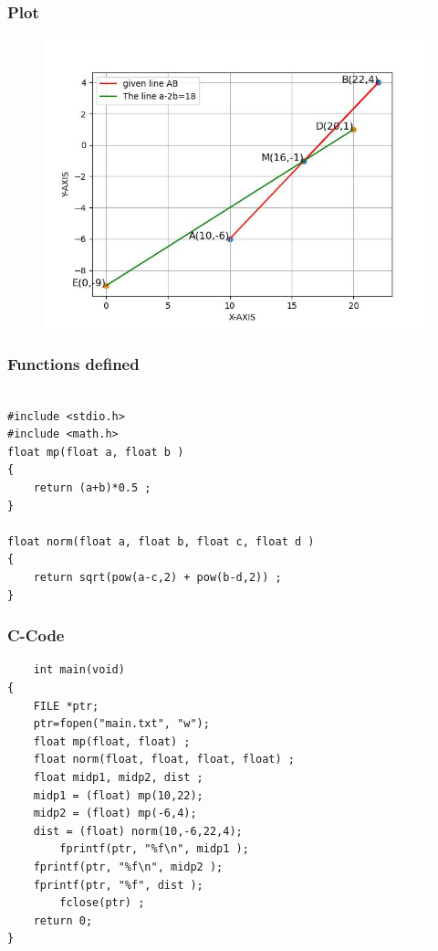\documentclass{beamer}
\begin{document}
\begin{frame}
\frametitle{Plot}
\begin{figure}
    \centering
    \includegraphics[width=0.7\linewidth]{figs/value.jpg}
    \caption{}
    \label{fig:enter-label}
\end{figure}
\end{frame}
\begin{frame}[fragile]
\frametitle{Functions defined}
\begin{verbatim}

#include <stdio.h>
#include <math.h>
float mp(float a, float b )
{
	return (a+b)*0.5 ;
}

float norm(float a, float b, float c, float d )
{
    return sqrt(pow(a-c,2) + pow(b-d,2)) ;
}

\end{verbatim}
\end{frame}
\begin{frame}[fragile]
\frametitle{C-Code}
\begin{verbatim}
    int main(void)
{
	FILE *ptr; 
	ptr=fopen("main.txt", "w");
	float mp(float, float) ;
	float norm(float, float, float, float) ;
	float midp1, midp2, dist ;
	midp1 = (float) mp(10,22);
	midp2 = (float) mp(-6,4);
	dist = (float) norm(10,-6,22,4);
        fprintf(ptr, "%f\n", midp1 );
	fprintf(ptr, "%f\n", midp2 );
	fprintf(ptr, "%f", dist );
        fclose(ptr) ;
	return 0;
}
\end{verbatim}
\end{frame}
\end{document}
